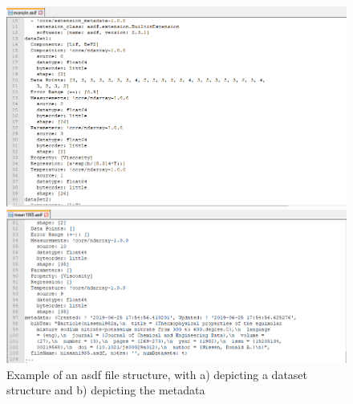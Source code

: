 \begin{figure}[h]
\centering
\begin{minipage}{0.5\textwidth}
  \centering
  \includegraphics[width=\linewidth]{msdf/figures/asdfEx1.PNG}
\end{minipage}%
\begin{minipage}{0.5\textwidth}
  \centering
  \includegraphics[width=\linewidth]{msdf/figures/asdfEx2.PNG}
\end{minipage}
\caption{Example of an asdf file structure, with a) depicting a dataset structure and b) depicting the metadata}
\label{fig:asdfExample}
\end{figure}

